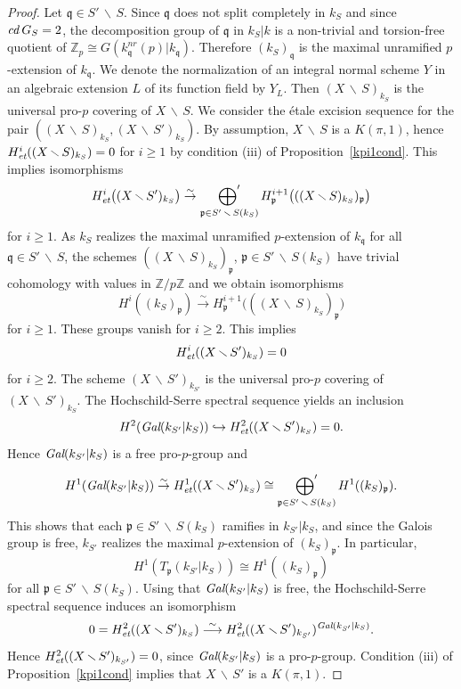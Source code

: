 \documentclass[10pt]{article}
\def\mapr#1{\stackrel{#1}{\longrightarrow}}
\newcommand{\Z}{{\mathbb Z}}
\newcommand{\p}{{\mathfrak p}}
\newcommand{\q}{{\mathfrak q}}
\newcommand{\sm}{{\,\smallsetminus\,}}
\newcommand{\et}{\text{\it et}}
\newcommand{\cd}{\text{\it cd}\:}
\newcommand{\Gal}{\text{\it Gal}}
\newcommand{\ressum}{\mathop{\hbox{${\displaystyle\bigoplus}'$}}\limits}
\theoremstyle{alex}
\theoremstyle{alexdef}
\begin{document}
 \begin{proof} Let $\q \in S'\sm S$. Since $\q$ does not split completely in $k_S$ and since $\cd G_S=2$, the decomposition group of $\q$ in $k_S|k$ is a non-trivial and torsion-free quotient of $\Z_p\cong G(k_\q^{nr}(p)|k_\q)$. Therefore $(k_S)_\q$ is the maximal unramified $p$-extension of $k_\q$. We denote the normalization of an integral normal scheme $Y$ in an algebraic extension $L$ of its function field by $Y_L$.
 Then $(X\sm S)_{k_S}$ is the universal pro-$p$ covering of $X\sm S$.  We consider the \'{e}tale excision sequence for
the pair $((X \sm S)_{k_S}, (X \sm S')_{k_S})$. By assumption, $X\sm S$ is a $K(\pi,1)$, hence   $H^i_{\et}((X \sm S)_{k_S})=0$ for $i \geq 1$ by condition (iii) of Proposition~\ref{kpi1cond}. This implies isomorphisms
\[
H^i_{\et}\big((X \sm S')_{k_S}\big) \stackrel{\sim}{\to} \ressum_{{\mathfrak p} \in S'\sm S (k_S)} H^{i+1}_{\mathfrak p}\big(((X \sm S)_{k_S})_{\mathfrak p}\big)
\]
for $i\geq 1$. As $k_S$ realizes the maximal unramified $p$-extension of $k_\q$ for all $\q\in S'\sm S$, the schemes $((X \sm S)_{k_S})_{\mathfrak p}$, $\p\in S'\sm S (k_S) $ have trivial cohomology with values in $\Z/p\Z$ and we obtain isomorphisms
\[
H^i((k_S)_\p)\stackrel{\sim}{\to} H^{i+1}_{\mathfrak p}\big(((X \sm S)_{k_S})_{\mathfrak p}\big)
\]
for $i\geq 1$. These groups vanish for $i\geq 2$. This implies
\[
H^i_{\et}((X\sm S')_{k_S})=0
\]
for $i\geq 2$. The scheme $(X\sm S')_{k_{S'}}$ is the universal pro-$p$ covering of
$(X\sm S')_{k_{S}}$.  The Hochschild-Serre spectral sequence yields an inclusion
\[
H^2(\Gal(k_{S'}|k_S)) \hookrightarrow H^2_{\et}((X\sm S')_{k_{S}})=0.
\]
Hence $\Gal(k_{S'}|k_S)$ is a free pro-$p$-group and

\[
H^1(\Gal(k_{S'}|k_S)) \stackrel{\sim}{\to} H^1_{\et}((X\sm S')_{k_S})
\cong \ressum_{{\mathfrak p}\in S'\sm S(k_S)} H^1((k_S)_{\mathfrak p}).
\]
This shows that each ${\mathfrak p} \in S'\sm S(k_S)$ ramifies in $k_{S'}|k_S$, and since the Galois group is free, $k_{S'}$ realizes the maximal $p$-extension of $(k_S)_{\mathfrak p}$. In particular,
\[
H^1(T_{\mathfrak p}(k_{S'}|k_S)) \cong H^1((k_S)_{\mathfrak p})
\]
for all $\mathfrak p \in S'\sm S (k_S)$.
Using that $\Gal(k_{S'}|k_S)$ is free, the Hochschild-Serre spectral sequence induces an isomorphism
\[
0=H^2_\et((X\sm S')_{k_{S}})\mapr{\sim} H^2_\et((X\sm S')_{k_{S'}})^{\Gal(k_{S'}|k_S)}.
\]
Hence $H^2_\et((X\sm S')_{k_{S'}})=0$, since $\Gal(k_{S'}|k_S)$ is a pro-$p$-group.  Condition (iii) of Proposition~\ref{kpi1cond}  implies that $X\sm S'$ is a $K(\pi,1)$.
\end{proof}
\end{document}
